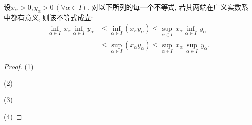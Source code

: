 \begin{quiza}
\begin{quizs}
\item 设\(x_\alpha>0,y_\alpha>0\,(\forall \alpha\in I)\). 对以下所列的每一个不等式, 若其两端在广义实数系中都有意义, 则该不等式成立: \[\begin{split}
\underset{\alpha\in I}{\inf}\,x_\alpha\underset{\alpha\in I}{\inf}\,y_\alpha&\leqslant \underset{\alpha\in I}{\inf}(x_\alpha y_\alpha)\leqslant\underset{\alpha\in I}{\sup}\,x_\alpha\underset{\alpha\in I}{\inf}\,y_\alpha\\&\leqslant
\underset{\alpha\in I}{\sup}(x_\alpha y_\alpha)\leqslant\underset{\alpha\in I}{\sup}\,x_\alpha\,\underset{\alpha\in I}{\sup}\,y_\alpha.
\end{split}\]
\end{quizs}
\begin{proof}
(1)

(2)

(3)

(4)
\end{proof}
\end{quiza}

